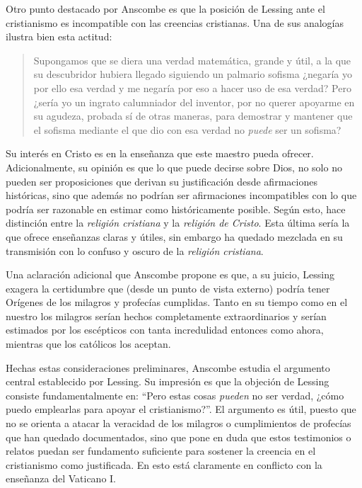 Otro punto destacado por Anscombe es que la posición de Lessing ante el
cristianismo es incompatible con las creencias cristianas. Una de sus analogías
ilustra bien esta actitud:
\blockquote[{\cite[449]{lessing1982escritos:demo}}]{Supongamos que se diera una
  verdad matemática, grande y útil, a la que su descubridor hubiera llegado
  siguiendo un palmario sofisma \textelp{} ¿negaría yo por ello esa verdad y me
  negaría por eso a hacer uso de esa verdad? Pero ¿sería yo un ingrato
  calumniador del inventor, por no querer apoyarme en su agudeza, probada sí de
  otras maneras, para demostrar y mantener que el sofisma mediante el que dio
  con esa verdad no \emph{puede} ser un sofisma?} Su interés en Cristo es en la
enseñanza que este maestro pueda ofrecer. Adicionalmente, su opinión es que lo
que puede decirse sobre Dios, no solo no pueden ser proposiciones que derivan su
justificación desde afirmaciones históricas, sino que además no podrían ser
afirmaciones incompatibles con lo que podría ser razonable en estimar como
históricamente posible. Según esto, hace distinción entre la \emph{religión
  cristiana} y la \emph{religión de Cristo}. Esta última sería la que ofrece
enseñanzas claras y útiles, sin embargo ha quedado mezclada en su transmisión
con lo confuso y oscuro de la \emph{religión cristiana}.

Una aclaración adicional que Anscombe propone es que, a su juicio, Lessing
exagera la certidumbre que (desde un punto de vista externo) podría tener
Orígenes de los milagros y profecías cumplidas. Tanto en su tiempo como en el
nuestro los milagros serían hechos completamente extraordinarios y serían
estimados por los escépticos con tanta incredulidad entonces como ahora,
mientras que los católicos los aceptan.

Hechas estas consideraciones preliminares, Anscombe estudia el argumento central
establecido por Lessing. Su impresión es que la objeción de Lessing consiste
fundamentalmente en: \enquote{Pero estas cosas \emph{pueden} no ser verdad,
  ¿cómo puedo emplearlas para apoyar el cristianismo?}. El argumento es útil,
puesto que no se orienta a atacar la veracidad de los milagros o cumplimientos
de profecías que han quedado documentados, sino que pone en duda que estos
testimonios o relatos puedan ser fundamento suficiente para sostener la creencia
en el cristianismo como justificada. En esto está claramente en conflicto con la
enseñanza del Vaticano I.

